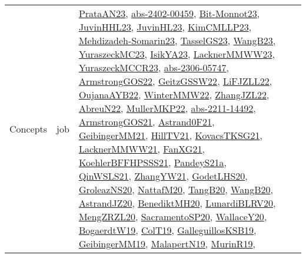 {\begin{longtable}{lp{3cm}>{\raggedright}p{6cm}>{\raggedright}p{6cm}p{8cm}}
Concepts & job & \href{articles/PrataAN23.pdf}{PrataAN23}\cite{PrataAN23}, \href{articles/abs-2402-00459.pdf}{abs-2402-00459}\cite{abs-2402-00459}, \href{papers/Bit-Monnot23.pdf}{Bit-Monnot23}\cite{Bit-Monnot23}, \href{papers/JuvinHHL23.pdf}{JuvinHHL23}\cite{JuvinHHL23}, \href{papers/JuvinHL23.pdf}{JuvinHL23}\cite{JuvinHL23}, \href{papers/KimCMLLP23.pdf}{KimCMLLP23}\cite{KimCMLLP23}, \href{papers/Mehdizadeh-Somarin23.pdf}{Mehdizadeh-Somarin23}\cite{Mehdizadeh-Somarin23}, \href{papers/TasselGS23.pdf}{TasselGS23}\cite{TasselGS23}, \href{papers/WangB23.pdf}{WangB23}\cite{WangB23}, \href{papers/YuraszeckMC23.pdf}{YuraszeckMC23}\cite{YuraszeckMC23}, \href{articles/IsikYA23.pdf}{IsikYA23}\cite{IsikYA23}, \href{articles/LacknerMMWW23.pdf}{LacknerMMWW23}\cite{LacknerMMWW23}, \href{articles/YuraszeckMCCR23.pdf}{YuraszeckMCCR23}\cite{YuraszeckMCCR23}, \href{articles/abs-2306-05747.pdf}{abs-2306-05747}\cite{abs-2306-05747}, \href{papers/ArmstrongGOS22.pdf}{ArmstrongGOS22}\cite{ArmstrongGOS22}, \href{papers/GeitzGSSW22.pdf}{GeitzGSSW22}\cite{GeitzGSSW22}, \href{papers/LiFJZLL22.pdf}{LiFJZLL22}\cite{LiFJZLL22}, \href{papers/OujanaAYB22.pdf}{OujanaAYB22}\cite{OujanaAYB22}, \href{papers/WinterMMW22.pdf}{WinterMMW22}\cite{WinterMMW22}, \href{papers/ZhangJZL22.pdf}{ZhangJZL22}\cite{ZhangJZL22}, \href{articles/AbreuN22.pdf}{AbreuN22}\cite{AbreuN22}, \href{articles/MullerMKP22.pdf}{MullerMKP22}\cite{MullerMKP22}, \href{articles/abs-2211-14492.pdf}{abs-2211-14492}\cite{abs-2211-14492}, \href{papers/ArmstrongGOS21.pdf}{ArmstrongGOS21}\cite{ArmstrongGOS21}, \href{papers/Astrand0F21.pdf}{Astrand0F21}\cite{Astrand0F21}, \href{papers/GeibingerMM21.pdf}{GeibingerMM21}\cite{GeibingerMM21}, \href{papers/HillTV21.pdf}{HillTV21}\cite{HillTV21}, \href{papers/KovacsTKSG21.pdf}{KovacsTKSG21}\cite{KovacsTKSG21}, \href{papers/LacknerMMWW21.pdf}{LacknerMMWW21}\cite{LacknerMMWW21}, \href{articles/FanXG21.pdf}{FanXG21}\cite{FanXG21}, \href{articles/KoehlerBFFHPSSS21.pdf}{KoehlerBFFHPSSS21}\cite{KoehlerBFFHPSSS21}, \href{articles/PandeyS21a.pdf}{PandeyS21a}\cite{PandeyS21a}, \href{articles/QinWSLS21.pdf}{QinWSLS21}\cite{QinWSLS21}, \href{articles/ZhangYW21.pdf}{ZhangYW21}\cite{ZhangYW21}, \href{papers/GodetLHS20.pdf}{GodetLHS20}\cite{GodetLHS20}, \href{papers/GroleazNS20.pdf}{GroleazNS20}\cite{GroleazNS20}, \href{papers/NattafM20.pdf}{NattafM20}\cite{NattafM20}, \href{papers/TangB20.pdf}{TangB20}\cite{TangB20}, \href{papers/WangB20.pdf}{WangB20}\cite{WangB20}, \href{articles/AstrandJZ20.pdf}{AstrandJZ20}\cite{AstrandJZ20}, \href{articles/BenediktMH20.pdf}{BenediktMH20}\cite{BenediktMH20}, \href{articles/LunardiBLRV20.pdf}{LunardiBLRV20}\cite{LunardiBLRV20}, \href{articles/MengZRZL20.pdf}{MengZRZL20}\cite{MengZRZL20}, \href{articles/SacramentoSP20.pdf}{SacramentoSP20}\cite{SacramentoSP20}, \href{articles/WallaceY20.pdf}{WallaceY20}\cite{WallaceY20}, \href{papers/BogaerdtW19.pdf}{BogaerdtW19}\cite{BogaerdtW19}, \href{papers/ColT19.pdf}{ColT19}\cite{ColT19}, \href{papers/GalleguillosKSB19.pdf}{GalleguillosKSB19}\cite{GalleguillosKSB19}, \href{papers/GeibingerMM19.pdf}{GeibingerMM19}\cite{GeibingerMM19}, \href{papers/MalapertN19.pdf}{MalapertN19}\cite{MalapertN19}, \href{papers/MurinR19.pdf}{MurinR19}\cite{MurinR19}, 
\end{longtable}}
